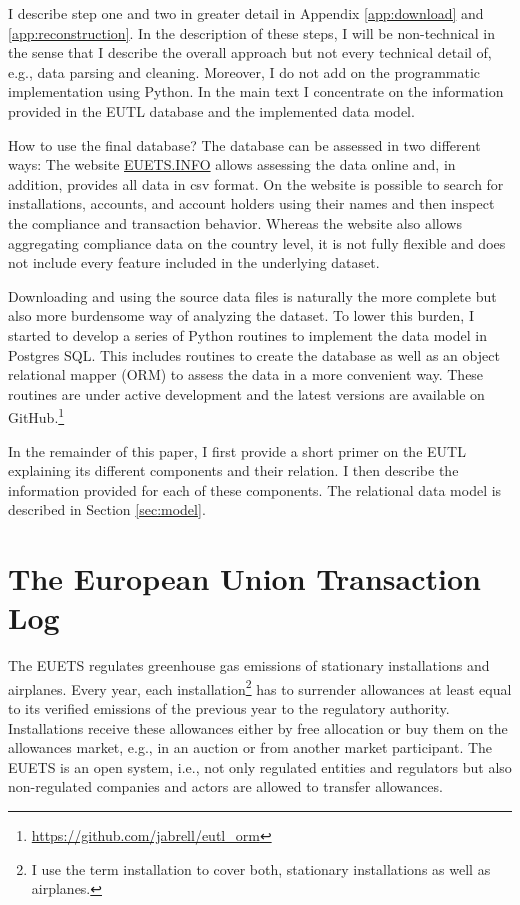 \documentclass[authoryear]{elsarticle}
\begin{document}
I describe step one and two in greater detail in Appendix \ref{app:download} and \ref{app:reconstruction}. In the description of these steps, I will be non-technical in the sense that I describe the overall approach but not every technical detail of, e.g., data parsing and cleaning. Moreover, I do not add on the programmatic implementation using Python. In the main text I concentrate on the information provided in the EUTL database and the implemented data model. 

How to use the final database? The database can be assessed in two different ways: The website \url{EUETS.INFO} allows assessing the data online and, in addition, provides all data in csv format. On the website is possible to search for installations, accounts, and account holders using their names and then inspect the compliance and transaction behavior. Whereas the website also allows aggregating compliance data on the country level, it is not fully flexible and does not include every feature included in the underlying dataset. 

Downloading and using the source data files is naturally the more complete but also more burdensome way of analyzing the dataset. To lower this burden, I started to develop a series of Python routines to implement the data model in Postgres SQL. This includes routines to create the database as well as an object relational mapper (ORM) to assess the data in a more convenient way. These routines are under active development and the latest versions are available on  GitHub.\footnote{\url{https://github.com/jabrell/eutl_orm}}

In the remainder of this paper, I first provide a short primer on the EUTL explaining its different components and their relation. I then describe the information provided for each of these components. The relational data model is described in Section \ref{sec:model}. 


	
\section{The European Union Transaction Log}
The EUETS regulates greenhouse gas emissions of stationary installations and airplanes. Every year, each installation\footnote{I use the term installation to cover both, stationary installations as well as airplanes.} has to surrender allowances at least equal to its verified emissions of the previous year to the regulatory authority. Installations receive these allowances either by free allocation or buy them on the allowances market, e.g., in an auction or from another market participant. The EUETS is an open system, i.e., not only regulated entities and regulators but also non-regulated companies and actors are allowed to transfer allowances. 
\end{document}
